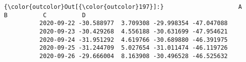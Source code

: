 \documentclass[11pt]{article}
\begin{document}
\begin{Verbatim}[commandchars=\\\{\}]
{\color{outcolor}Out[{\color{outcolor}197}]:}                     A         B          C          D
          2020-09-22 -30.588977  3.709308 -29.998354 -47.047088
          2020-09-23 -30.429268  4.556188 -30.631699 -47.954621
          2020-09-24 -31.951292  4.619766 -30.689880 -46.391975
          2020-09-25 -31.244709  5.027654 -31.011474 -46.119726
          2020-09-26 -29.666004  8.163908 -30.496528 -46.525632
\end{Verbatim}





    
\end{document}
